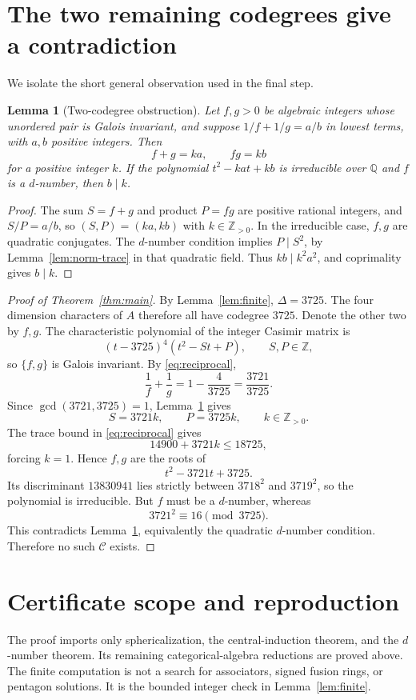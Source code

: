 \documentclass[11pt]{article}
\newtheorem{lemma}[theorem]{Lemma}
\newcommand{\Q}{\mathbb Q}
\newcommand{\Z}{\mathbb Z}
\numberwithin{equation}{section}
\begin{document}
\section{The two remaining codegrees give a contradiction}
We isolate the short general observation used in the final step.
\begin{lemma}[Two-codegree obstruction]\label{lem:two}
Let $f,g>0$ be algebraic integers whose unordered pair is Galois invariant,
and suppose $1/f+1/g=a/b$ in lowest terms, with $a,b$ positive integers.
Then
\[
f+g=ka,\qquad fg=kb
\]
for a positive integer $k$. If the polynomial
$t^2-kat+kb$ is irreducible over $\Q$ and $f$ is a $d$-number, then $b\mid k$.
\end{lemma}
\begin{proof}
The sum $S=f+g$ and product $P=fg$ are positive rational integers, and
$S/P=a/b$, so $(S,P)=(ka,kb)$ with $k\in\Z_{>0}$.
In the irreducible case, $f,g$ are quadratic conjugates. The $d$-number
condition implies $P\mid S^2$, by Lemma~\ref{lem:norm-trace} in that quadratic
field. Thus $kb\mid k^2a^2$, and coprimality gives $b\mid k$.
\end{proof}

\begin{proof}[Proof of Theorem~\ref{thm:main}]
By Lemma~\ref{lem:finite}, $\Delta=3725$. The four dimension characters of $A$
therefore all have codegree $3725$. Denote the other two by $f,g$.
The characteristic polynomial of the integer Casimir matrix is
\[
(t-3725)^4(t^2-St+P),\qquad S,P\in\Z,
\]
so $\{f,g\}$ is Galois invariant. By \eqref{eq:reciprocal},
\[
\frac1f+\frac1g=1-\frac4{3725}=\frac{3721}{3725}.
\]
Since $\gcd(3721,3725)=1$, Lemma~\ref{lem:two} gives
\[
S=3721k,\qquad P=3725k,\qquad k\in\Z_{>0}.
\]
The trace bound in \eqref{eq:reciprocal} gives
\[
14900+3721k\le18725,
\]
forcing $k=1$. Hence $f,g$ are the roots of
\begin{equation}\label{eq:forbidden}
t^2-3721t+3725.
\end{equation}
Its discriminant $13830941$ lies strictly between $3718^2$ and $3719^2$, so
the polynomial is irreducible. But $f$ must be a $d$-number, whereas
\[
3721^2\equiv16\pmod{3725}.
\]
This contradicts Lemma~\ref{lem:two}, equivalently the quadratic $d$-number
condition. Therefore no such $\mathcal C$ exists.
\end{proof}

\section{Certificate scope and reproduction}
The proof imports only sphericalization, the central-induction theorem, and
the $d$-number theorem. Its remaining categorical-algebra reductions are proved
above. The finite computation is not a search for associators, signed fusion
rings, or pentagon solutions. It is the bounded integer check in
Lemma~\ref{lem:finite}.
\end{document}
